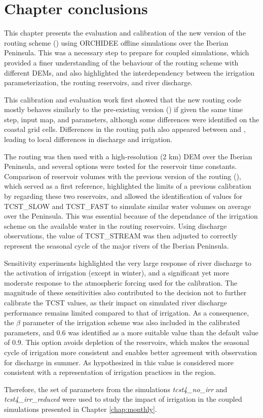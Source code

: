 \pagebreak

\section{Chapter conclusions}

This chapter presents the evaluation and calibration of the new version of the routing scheme (\native) using ORCHIDEE offline simulations over the Iberian Peninsula. This was a necessary step to prepare for coupled simulations, which provided a finer understanding of the behaviour of the routing scheme with different DEMs, and also highlighted the interdependency between the irrigation parameterization, the routing reservoirs, and river discharge. 

This calibration and evaluation work first showed that the new routing code mostly behaves similarly to the pre-existing version (\std) if given the same time step, input map, and parameters, although some differences were identified on the coastal grid cells. Differences in the routing path also appeared between \std and \native, leading to local differences in discharge and irrigation.

The \native routing was then used with a high-resolution (2 km) DEM over the Iberian Peninsula, and several options were tested for the reservoir time constants. 
Comparison of reservoir volumes with the previous version of the routing (\std), which served as a first reference, highlighted the limits of a previous calibration by \citet{kilic_evaluation_2023} regarding these two reservoirs, and allowed the identification of values for TCST\_SLOW and TCST\_FAST to simulate similar water volumes on average over the Peninsula. This was essential because of the dependance of the irrigation scheme on the available water in the routing reservoirs.
Using discharge observations, the value of TCST\_STREAM was then adjusted to correctly represent the seasonal cycle of the major rivers of the Iberian Peninsula.

Sensitivity experiments highlighted the very large response of river discharge to the activation of irrigation (except in winter), and a significant yet more moderate response to the atmospheric forcing used for the calibration. 
The magnitude of these sensitivities also contributed to the decision not to further calibrate the TCST values, as their impact on simulated river discharge performance remains limited compared to that of irrigation.
As a consequence, the $\beta$ parameter of the irrigation scheme was also included in the calibrated parameters, and 0.6 was identified as a more suitable value than the default value of 0.9. This option avoids depletion of the reservoirs, which makes the seasonal cycle of irrigation more consistent and enables better agreement with observation for discharge in summer. As hypothesized in \citet{arboleda-obando_validation_2024} this value is considered more consistent with a representation of irrigation practices in the region.

Therefore, the set of parameters from the simulations \textit{tcst4\_no\_irr} and \textit{tcst4\_irr\_reduced} were used to study the impact of irrigation in the coupled simulations presented in Chapter \ref{chap:monthly}.
